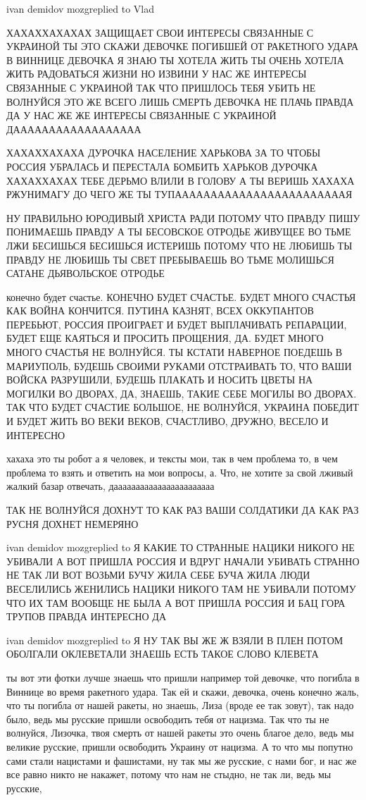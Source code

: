ivan demidov mozgreplied to Vlad

ХАХАХХАХАХАХ ЗАЩИЩАЕТ СВОИ ИНТЕРЕСЫ СВЯЗАННЫЕ С УКРАИНОЙ ТЫ ЭТО СКАЖИ ДЕВОЧКЕ
ПОГИБШЕЙ ОТ РАКЕТНОГО УДАРА В ВИННИЦЕ ДЕВОЧКА Я ЗНАЮ ТЫ ХОТЕЛА ЖИТЬ ТЫ ОЧЕНЬ
ХОТЕЛА ЖИТЬ РАДОВАТЬСЯ ЖИЗНИ НО ИЗВИНИ У НАС ЖЕ ИНТЕРЕСЫ СВЯЗАННЫЕ С УКРАИНОЙ
ТАК ЧТО ПРИШЛОСЬ ТЕБЯ УБИТЬ НЕ ВОЛНУЙСЯ ЭТО ЖЕ ВСЕГО ЛИШЬ СМЕРТЬ ДЕВОЧКА НЕ
ПЛАЧЬ ПРАВДА ДА У НАС ЖЕ ЖЕ ИНТЕРЕСЫ СВЯЗАННЫЕ С УКРАИНОЙ ДАААААААААААААААААА

ХАХАХХАХАХА ДУРОЧКА НАСЕЛЕНИЕ ХАРЬКОВА ЗА ТО ЧТОБЫ РОССИЯ УБРАЛАСЬ И ПЕРЕСТАЛА
БОМБИТЬ ХАРЬКОВ ДУРОЧКА ХАХАХХАХАХ ТЕБЕ ДЕРЬМО ВЛИЛИ В ГОЛОВУ А ТЫ ВЕРИШЬ
ХАХАХА РЖУНИМАГУ ДО ЧЕГО ЖЕ ТЫ ТУПААААААААААААААААААААААААЯ

НУ ПРАВИЛЬНО ЮРОДИВЫЙ ХРИСТА РАДИ ПОТОМУ ЧТО ПРАВДУ ПИШУ ПОНИМАЕШЬ ПРАВДУ А ТЫ
БЕСОВСКОЕ ОТРОДЬЕ ЖИВУЩЕЕ ВО ТЬМЕ ЛЖИ БЕСИШЬСЯ БЕСИШЬСЯ ИСТЕРИШЬ ПОТОМУ ЧТО НЕ
ЛЮБИШЬ ТЫ ПРАВДУ НЕ ЛЮБИШЬ ТЫ СВЕТ ПРЕБЫВАЕШЬ ВО ТЬМЕ МОЛИШЬСЯ САТАНЕ
ДЬЯВОЛЬСКОЕ ОТРОДЬЕ

конечно будет счастье. КОНЕЧНО БУДЕТ СЧАСТЬЕ. БУДЕТ МНОГО СЧАСТЬЯ КАК ВОЙНА
КОНЧИТСЯ. ПУТИНА КАЗНЯТ, ВСЕХ ОККУПАНТОВ ПЕРЕБЬЮТ, РОССИЯ ПРОИГРАЕТ И БУДЕТ
ВЫПЛАЧИВАТЬ РЕПАРАЦИИ, БУДЕТ ЕЩЕ КАЯТЬСЯ И ПРОСИТЬ ПРОЩЕНИЯ, ДА. БУДЕТ МНОГО
МНОГО СЧАСТЬЯ НЕ ВОЛНУЙСЯ. ТЫ КСТАТИ НАВЕРНОЕ ПОЕДЕШЬ В МАРИУПОЛЬ, БУДЕШЬ
СВОИМИ РУКАМИ ОТСТРАИВАТЬ ТО, ЧТО ВАШИ ВОЙСКА РАЗРУШИЛИ, БУДЕШЬ ПЛАКАТЬ И
НОСИТЬ ЦВЕТЫ НА МОГИЛКИ ВО ДВОРАХ, ДА, ЗНАЕШЬ, ТАКИЕ СЕБЕ МОГИЛЫ ВО ДВОРАХ. ТАК
ЧТО БУДЕТ СЧАСТИЕ БОЛЬШОЕ, НЕ ВОЛНУЙСЯ, УКРАИНА ПОБЕДИТ И БУДЕТ ЖИТЬ ВО ВЕКИ
ВЕКОВ, СЧАСТЛИВО, ДРУЖНО, ВЕСЕЛО И ИНТЕРЕСНО

хахаха это ты робот а я человек, и тексты мои, так в чем проблема то, в чем
проблема то взять и ответить на мои вопросы, а. Что, не хотите за свой лживый
жалкий базар отвечать, дааааааааааааааааааааааа

ТАК НЕ ВОЛНУЙСЯ ДОХНУТ ТО КАК РАЗ ВАШИ СОЛДАТИКИ ДА КАК РАЗ РУСНЯ ДОХНЕТ
НЕМЕРЯНО

ivan demidov mozgreplied to Я КАКИЕ ТО СТРАННЫЕ НАЦИКИ НИКОГО НЕ УБИВАЛИ А ВОТ
ПРИШЛА РОССИЯ И ВДРУГ НАЧАЛИ УБИВАТЬ СТРАННО НЕ ТАК ЛИ ВОТ ВОЗЬМИ БУЧУ ЖИЛА
СЕБЕ БУЧА ЖИЛА ЛЮДИ ВЕСЕЛИЛИСЬ ЖЕНИЛИСЬ НАЦИКИ НИКОГО ТАМ НЕ УБИВАЛИ ПОТОМУ ЧТО
ИХ ТАМ ВООБЩЕ НЕ БЫЛА А ВОТ ПРИШЛА РОССИЯ И БАЦ ГОРА ТРУПОВ ПРАВДА ИНТЕРЕСНО ДА

ivan demidov mozgreplied to Я НУ ТАК ВЫ ЖЕ Ж ВЗЯЛИ В ПЛЕН ПОТОМ ОБОЛГАЛИ
ОКЛЕВЕТАЛИ ЗНАЕШЬ ЕСТЬ ТАКОЕ СЛОВО КЛЕВЕТА

ты вот эти фотки лучше знаешь что пришли например той девочке, что погибла в
Виннице во время ракетного удара. Так ей и скажи, девочка, очень конечно жаль,
что ты погибла от нашей ракеты, но знаешь, Лиза (вроде ее так зовут), так надо
было, ведь мы русские пришли освободить тебя от нацизма. Так что ты не
волнуйся, Лизочка, твоя смерть от нашей ракеты это очень благое дело, ведь мы
великие русские, пришли освободить Украину от нацизма. А то что мы попутно сами
стали нацистами и фашистами, ну так мы же русские, с нами бог, и нас же все
равно никто не накажет, потому что нам не стыдно, не так ли, ведь мы русские, 

